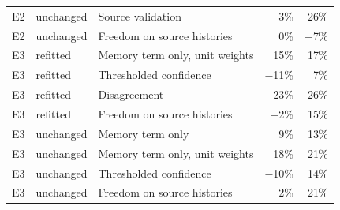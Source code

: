 \begin{table}[t]
\begin{tabular}{@{}ll>{\raggedright\arraybackslash}p{6.4cm}rr@{}}
E2 & unchanged & Source validation & 3\% & 26\% \\
E2 & unchanged & Freedom on source histories & 0\% & $-$7\% \\
E3 & refitted & Memory term only, unit weights & 15\% & 17\% \\
E3 & refitted & Thresholded confidence & $-$11\% & 7\% \\
E3 & refitted & Disagreement & 23\% & 26\% \\
E3 & refitted & Freedom on source histories & $-$2\% & 15\% \\
E3 & unchanged & Memory term only & 9\% & 13\% \\
E3 & unchanged & Memory term only, unit weights & 18\% & 21\% \\
E3 & unchanged & Thresholded confidence & $-$10\% & 14\% \\
E3 & unchanged & Freedom on source histories & 2\% & 21\% \\
\bottomrule
\end{tabular}
\end{table}
